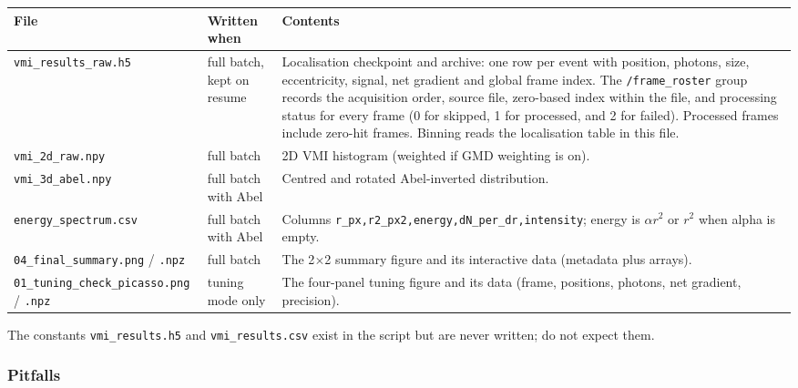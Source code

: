 \documentclass[11pt,a4paper]{article}
\newcommand{\code}[1]{\texttt{#1}}
\begin{document}
\begin{center}
\footnotesize
\begin{longtable}{@{}L{4.6cm}L{3.2cm}L{7.4cm}@{}}
\toprule
File & Written when & Contents \\
\midrule
\endhead
\bottomrule
\endfoot
\code{vmi\_\allowbreak{}results\_\allowbreak{}raw.h5} & full batch, kept on resume & Localisation
checkpoint and archive: one row per event with position, photons, size,
eccentricity, signal, net gradient and global frame index. The
\code{/frame\_roster} group records the acquisition order, source file,
zero-based index within the file, and processing status for every frame
(0 for skipped, 1 for processed, and 2 for failed). Processed frames include
zero-hit frames. Binning reads the localisation table in this file. \\
\addlinespace
\code{vmi\_\allowbreak{}2d\_\allowbreak{}raw.npy} & full batch & 2D VMI histogram (weighted if GMD
weighting is on). \\
\addlinespace
\code{vmi\_\allowbreak{}3d\_\allowbreak{}abel.npy} & full batch with Abel & Centred and rotated
Abel-inverted distribution. \\
\addlinespace
\code{energy\_\allowbreak{}spectrum.csv} & full batch with Abel & Columns
\code{r\_\allowbreak{}px,r2\_\allowbreak{}px2,energy,dN\_\allowbreak{}per\_\allowbreak{}dr,intensity}; energy is $\alpha r^2$ or
$r^2$ when alpha is empty. \\
\addlinespace
\code{04\_\allowbreak{}final\_\allowbreak{}summary.png} / \code{.\allowbreak{}npz} & full batch & The 2$\times$2
summary figure and its interactive data (metadata plus arrays). \\
\addlinespace
\code{01\_\allowbreak{}tuning\_\allowbreak{}check\_\allowbreak{}picasso.png} / \code{.\allowbreak{}npz} & tuning mode only & The
four-panel tuning figure and its data (frame, positions, photons, net
gradient, precision). \\
\end{longtable}
\end{center}

The constants \code{vmi\_\allowbreak{}results.\allowbreak{}h5} and \code{vmi\_\allowbreak{}results.\allowbreak{}csv} exist in
the script but are never written; do not expect them.

\subsubsection*{Pitfalls}
\end{document}
